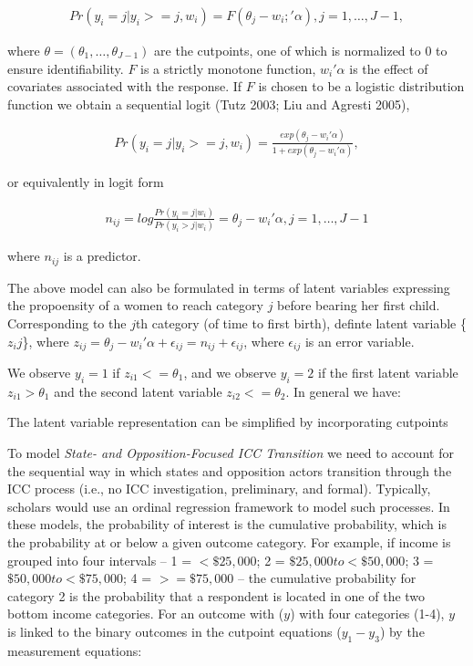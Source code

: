 \begin{align}
	Pr(y_{i} = j | y_{i} >= j, w_{i})= F(\theta_{j} - w_{i};'\alpha), j=1, \ldots, J-1,
\end{align}

where $\theta = (\theta_{1}, \ldots, \theta_{J-1})$ are the cutpoints, one of which is normalized to 0 to ensure identifiability. $F$ is a strictly monotone function, $w_{i}'\alpha$ is the effect of covariates associated with the response. If $F$ is chosen to be a logistic distribution function we obtain a sequential logit (Tutz 2003; Liu and Agresti 2005),

\begin{align}
	Pr(y_{i}=j | y_{i} >= j, w_{i}) = \frac{exp(\theta_{j} - w_{i}'\alpha)}{1+exp(\theta_{j} - w_{i}'\alpha)},
\end{align}

or equivalently in logit form

\begin{align}
	n_{ij} = log \frac{Pr(y_{i} = j |w_{i})}{Pr(y_{i}>j | w_{i})} = \theta_{j} - w_{i}'\alpha, j=1, \ldots, J-1
\end{align}

where $n_{ij}$ is a predictor.

The above model can also be formulated in terms of latent variables expressing the propoensity of a women to reach category $j$ before bearing her first child. Corresponding to the $j$th category (of time to first birth), definte latent variable \{$z_ij$\}, where $z_{ij} = \theta_{j} - w_{i}'\alpha + \epsilon_{ij} = n_{ij} + \epsilon_{ij}$, where $\epsilon_{ij}$ is an error variable.

We observe $y_{i} = 1$ if $z_{i1} <= \theta_{1}$, and we observe $y_{i}=2$ if the first latent variable $z_{i1} > \theta_{1}$ and the second latent variable $z_{i2} <= \theta_{2}$. In general we have:

The latent variable representation can be simplified by incorporating cutpoints

To model \emph{State- and Opposition-Focused ICC Transition} we need to account for the sequential way in which states and opposition actors transition through the ICC process (i.e., no ICC investigation, preliminary, and formal). Typically, scholars would use an ordinal regression framework to model such processes. In these models, the probability of interest is the cumulative probability, which is the probability at or below a given outcome category. For example, if income is grouped into four intervals -- 1 = $< \$25,000$; 2 = $\$25,000 to <\$50,000$; 3 = $\$50,000 to <\$75,000$; 4 = $>=\$75,000$ -- the cumulative probability for category 2 is the probability that a respondent is located in one of the two bottom income categories. For an outcome with ($y$) with four categories (1-4), $y$ is linked to the binary outcomes in the cutpoint equations ($y_{1} - y_{3}$) by the measurement equations:

